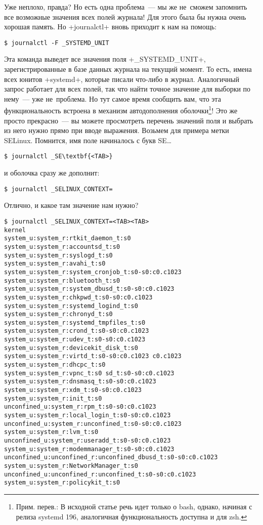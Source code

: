 \documentclass[10pt,oneside,a4paper]{article}
\begin{document}
Уже неплохо, правда? Но есть одна проблема~--- мы же не~сможем запомнить все
возможные значения всех полей журнала! Для этого была бы нужна очень хорошая
память. Но +journalctl+ вновь приходит к нам на помощь:
\begin{Verbatim}
$ journalctl -F _SYSTEMD_UNIT
\end{Verbatim}
Эта команда выведет все значения поля +_SYSTEMD_UNIT+, зарегистрированные в базе
данных журнала на текущий момент. То есть, имена всех юнитов +systemd+, которые
писали что-либо в журнал. Аналогичный запрос работает для всех полей, так что
найти точное значение для выборки по нему~--- уже не~проблема. Но тут самое
время сообщить вам, что эта функциональность встроена в механизм автодополнения
оболочки\footnote{Прим. перев.: В исходной статье речь идет только о bash,
однако, начиная с релиза systemd 196, аналогичная функциональность доступна и
для zsh.}! Это же просто прекрасно~--- вы можете просмотреть перечень значений
поля и выбрать из него нужно прямо при вводе выражения. Возьмем для примера
метки SELinux. Помнится, имя поле начиналось с букв SE\ldots{}
\begin{Verbatim}[commandchars=\\\{\}]
$ journalctl _SE\textbf{<TAB>}
\end{Verbatim}
и оболочка сразу же дополнит:
\begin{Verbatim}
$ journalctl _SELINUX_CONTEXT=	
\end{Verbatim}
Отлично, и какое там значение нам нужно?
\begin{Verbatim}[fontsize=\small]
$ journalctl _SELINUX_CONTEXT=<TAB><TAB>
kernel                                              system_u:system_r:rtkit_daemon_t:s0
system_u:system_r:accountsd_t:s0                    system_u:system_r:syslogd_t:s0
system_u:system_r:avahi_t:s0                        system_u:system_r:system_cronjob_t:s0-s0:c0.c1023
system_u:system_r:bluetooth_t:s0                    system_u:system_r:system_dbusd_t:s0-s0:c0.c1023
system_u:system_r:chkpwd_t:s0-s0:c0.c1023           system_u:system_r:systemd_logind_t:s0
system_u:system_r:chronyd_t:s0                      system_u:system_r:systemd_tmpfiles_t:s0
system_u:system_r:crond_t:s0-s0:c0.c1023            system_u:system_r:udev_t:s0-s0:c0.c1023
system_u:system_r:devicekit_disk_t:s0               system_u:system_r:virtd_t:s0-s0:c0.c1023 c0.c1023
system_u:system_r:dhcpc_t:s0                        system_u:system_r:vpnc_t:s0 sd_t:s0-s0:c0.c1023
system_u:system_r:dnsmasq_t:s0-s0:c0.c1023          system_u:system_r:xdm_t:s0-s0:c0.c1023
system_u:system_r:init_t:s0                         unconfined_u:system_r:rpm_t:s0-s0:c0.c1023
system_u:system_r:local_login_t:s0-s0:c0.c1023      unconfined_u:system_r:unconfined_t:s0-s0:c0.c1023
system_u:system_r:lvm_t:s0                          unconfined_u:system_r:useradd_t:s0-s0:c0.c1023
system_u:system_r:modemmanager_t:s0-s0:c0.c1023     unconfined_u:unconfined_r:unconfined_dbusd_t:s0-s0:c0.c1023
system_u:system_r:NetworkManager_t:s0               unconfined_u:unconfined_r:unconfined_t:s0-s0:c0.c1023
system_u:system_r:policykit_t:s0                             
\end{Verbatim}
\end{document}
